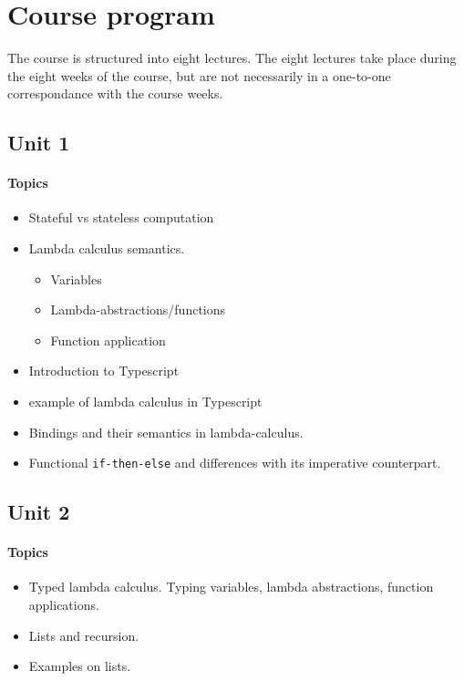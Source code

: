 \section{Course program}
The course is structured into eight lectures.
The eight lectures take place during the eight weeks of the course, but are not necessarily in a one-to-one correspondance with the course weeks.

\subsection*{Unit 1}
\paragraph*{Topics}
\begin{itemize}[noitemsep]
	\item Stateful vs stateless computation
  \item Lambda calculus semantics.
    \begin{itemize}[noitemsep]
      \item Variables
      \item Lambda-abstractions/functions
      \item Function application
    \end{itemize}	
  \item Introduction to Typescript
  \item example of lambda calculus in Typescript
  \item Bindings and their semantics in lambda-calculus.
  \item Functional \texttt{if-then-else} and differences with its imperative counterpart.
\end{itemize}

\subsection*{Unit 2}
\paragraph*{Topics}			
\begin{itemize}[noitemsep]
	\item Typed lambda calculus. Typing variables, lambda abstractions, function applications.
  \item Lists and recursion.
  \item Examples on lists.
\end{itemize}


